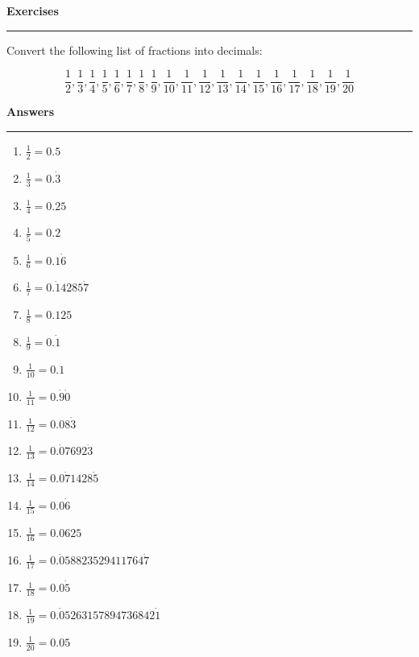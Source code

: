 \documentclass{article}
\begin{document}
\newpage

\noindent \textbf{Exercises}

\medskip

\hrule

\medskip

\noindent Convert the following list of fractions into decimals:

\[
\frac{1}{2}, \frac{1}{3}, \frac{1}{4}, \frac{1}{5}, \frac{1}{6}, \frac{1}{7}, \frac{1}{8}, \frac{1}{9}, \frac{1}{10}, \frac{1}{11}, \frac{1}{12}, \frac{1}{13}, \frac{1}{14}, \frac{1}{15}, \frac{1}{16}, \frac{1}{17}, \frac{1}{18}, \frac{1}{19}, \frac{1}{20}
\]

\newpage

\noindent \textbf{Answers}

\medskip

\hrule

\medskip

\begin{enumerate}
    \item[] \(\frac{1}{2}=0.5\)
    \item[] \(\frac{1}{3}=0.\dot{3}\)
    \item[] \(\frac{1}{4}=0.25\)
    \item[] \(\frac{1}{5}=0.2\)
    \item[] \(\frac{1}{6}=0.1\dot{6}\)
    \item[] \(\frac{1}{7}=0.\dot{1}4285\dot{7}\)
    \item[] \(\frac{1}{8}=0.125\)
    \item[] \(\frac{1}{9}=0.\dot{1}\)
    \item[] \(\frac{1}{10}=0.1\)
    \item[] \(\frac{1}{11}=0.\dot{9}\dot{0}\)
    \item[] \(\frac{1}{12}=0.08\dot{3}\)
    \item[] \(\frac{1}{13}=0.\dot{0}7692\dot{3}\)
    \item[] \(\frac{1}{14}=0.0\dot{7}1428\dot{5}\)
    \item[] \(\frac{1}{15}=0.0\dot{6}\)
    \item[] \(\frac{1}{16}=0.0625\)
    \item[] \(\frac{1}{17}=0.\dot{0}58823529411764\dot{7}\)
    \item[] \(\frac{1}{18}=0.0\dot{5}\)
    \item[] \(\frac{1}{19}=0.\dot{0}5263157894736842\dot{1}\)
    \item[] \(\frac{1}{20}=0.05\)
\end{enumerate}
\end{document}
